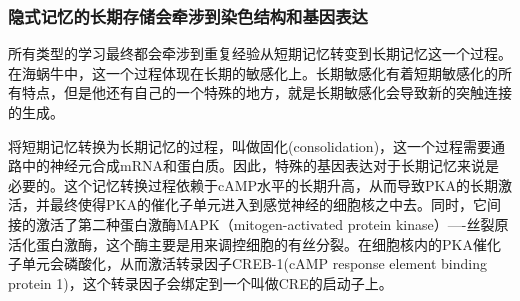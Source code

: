 \documentclass[UTF8,nofonts]{ctexart}
\begin{document}
\subsubsection{隐式记忆的长期存储会牵涉到染色结构和基因表达}
所有类型的学习最终都会牵涉到重复经验从短期记忆转变到长期记忆这一个过程。在海蜗牛中，这一个过程体现在长期的敏感化上。长期敏感化有着短期敏感化的所有特点，但是他还有自己的一个特殊的地方，就是长期敏感化会导致新的突触连接的生成。
\par
将短期记忆转换为长期记忆的过程，叫做固化(consolidation)，这一个过程需要通路中的神经元合成mRNA和蛋白质。因此，特殊的基因表达对于长期记忆来说是必要的。这个记忆转换过程依赖于cAMP水平的长期升高，从而导致PKA的长期激活，并最终使得PKA的催化子单元进入到感觉神经的细胞核之中去。同时，它间接的激活了第二种蛋白激酶MAPK（mitogen-activated protein kinase）----丝裂原活化蛋白激酶，这个酶主要是用来调控细胞的有丝分裂。在细胞核内的PKA催化子单元会磷酸化，从而激活转录因子CREB-1(cAMP response element binding protein 1)，这个转录因子会绑定到一个叫做CRE的启动子上。
\end{document}
